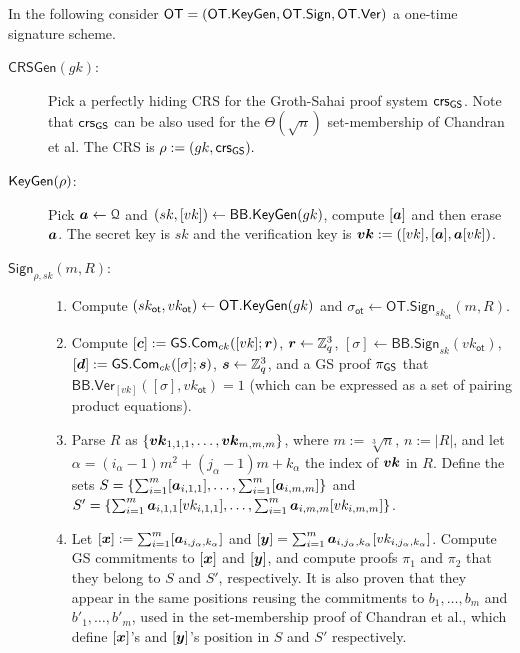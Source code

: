 In the following consider $\mathsf{OT}=(\mathsf{OT}.\mathsf{KeyGen},\mathsf{OT}.\mathsf{Sign},\mathsf{OT}.\mathsf{Ver})$ a one-time signature scheme.
\begin{description}
\item[$\mathsf{CRSGen}(gk)$:] Pick a perfectly hiding CRS for the Groth-Sahai proof system $\mathsf{crs}_{\mathsf{GS}}$. Note that $\mathsf{crs}_{\mathsf{GS}}$ can be also used for the $\Theta(\sqrt{n})$ set-membership of Chandran et al. The CRS is $\rho:=(gk,\mathsf{crs}_{\mathsf{GS}}).$
\item[$\mathsf{KeyGen}(\rho)$:] Pick ${\boldsymbol{a}}\gets\mathcal{Q}$ and $(sk,[vk])\gets\mathsf{BB}.\mathsf{KeyGen}(gk)$, compute $[{\boldsymbol{a}}]$ and then erase ${\boldsymbol{a}}$. The secret key is $sk$ and the verification key is ${\boldsymbol{vk}}:=([vk],[{\boldsymbol{a}}],{\boldsymbol{a}}[vk])$.
\item[$\mathsf{Sign}_{\rho,sk}(m,R)$:]
\begin{enumerate}
\item Compute $(sk_\mathsf{ot},vk_\mathsf{ot})\gets\mathsf{OT}.\mathsf{KeyGen}(gk)$ and $\sigma_\mathsf{ot}\gets\allowbreak\mathsf{OT}.\allowbreak\mathsf{Sign}_{sk_\mathsf{ot}}(m,R)$.
\item Compute $[{\boldsymbol{c}}]:={\mathsf{GS}}.\mathsf{Com}_{ck}([vk];{\boldsymbol{r}})$, ${\boldsymbol{r}}\gets\mathbb{Z}_q^3$, $[\sigma]\gets\mathsf{BB}.\mathsf{Sign}_{sk}(vk_\mathsf{ot})$, $[{\boldsymbol{d}}]:={\mathsf{GS}}.\mathsf{Com}_{ck}([\sigma];{\boldsymbol{s}})$, ${\boldsymbol{s}}\gets\mathbb{Z}_q^3$, and a GS proof $\pi_{\mathsf{GS}}$ that $\mathsf{BB}.\mathsf{Ver}_{[vk]}(\allowbreak[\sigma],vk_\mathsf{ot})=1$ (which can be expressed as a set of pairing product equations).
\item Parse $R$ as $\{{\boldsymbol{vk}}_{1,1,1},\ldots,{\boldsymbol{vk}}_{m,m,m}\}$, where $m:=\sqrt[3]{n}$, $n:=|R|$, and let $\alpha=(i_\alpha-1)m^2+(j_\alpha-1)m + k_\alpha$ the index of ${\boldsymbol{vk}}$ in $R$. Define the sets $S=\{\sum_{i=1}^{m}[{\boldsymbol{a}}_{i,1,1}],\allowbreak\ldots,\sum_{i=1}^{m}[{\boldsymbol{a}}_{i,m,m}]\}$ and\\ $S'=\{\sum_{i=1}^{m}{\boldsymbol{a}}_{i,1,1}[vk_{i,1,1}],\allowbreak\ldots,\sum_{i=1}^{m}{\boldsymbol{a}}_{i,m,m}[vk_{i,m,m}]\}$.
\item Let $[{\boldsymbol{x}}]:=\sum_{i=1}^{m}[{\boldsymbol{a}}_{i,j_\alpha,k_\alpha}]$ and $[{\boldsymbol{y}}]=\sum_{i=1}^{m}{\boldsymbol{a}}_{i,j_\alpha,k_\alpha}[vk_{i,j_\alpha,k_\alpha}]$. Compute GS commitments to $[{\boldsymbol{x}}]$ and $[{\boldsymbol{y}}]$, and compute proofs $\pi_1$ and $\pi_2$ that they belong to $S$ and $S'$, respectively. It is also proven that they appear in the same positions reusing the commitments to $b_1,\ldots,b_{m}$ and $b'_1,\ldots,b'_{m}$, used in the set-membership proof of Chandran et al., which define $[{\boldsymbol{x}}]$'s and $[{\boldsymbol{y}}]$'s position in $S$ and $S'$ respectively.

\end{enumerate}
\end{description}
